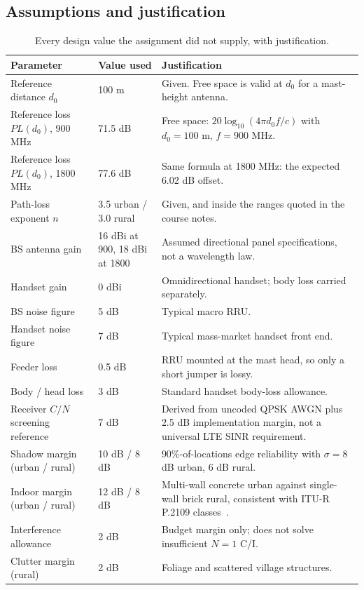 \documentclass[9pt,a4paper]{extarticle}
\begin{document}
\subsection{Assumptions and justification}
\begin{table}[H]\centering\small
\caption{Every design value the assignment did not supply, with justification.}
\label{tab:assume}
\begin{tabularx}{\textwidth}{@{}p{3.5cm}p{1.9cm}X@{}}
\toprule
\textbf{Parameter} & \textbf{Value used} & \textbf{Justification} \\
\midrule
Reference distance $d_0$ & 100 m & Given. Free space is valid at $d_0$ for a mast-height antenna. \\
Reference loss $PL(d_0)$, 900 MHz & 71.5 dB & Free space: $20\log_{10}(4\pi d_0 f/c)$ with $d_0=100$ m, $f=900$ MHz. \\
Reference loss $PL(d_0)$, 1800 MHz & 77.6 dB & Same formula at 1800 MHz: the expected 6.02 dB offset. \\
Path-loss exponent $n$ & 3.5 urban / 3.0 rural & Given, and inside the ranges quoted in the course notes. \\
BS antenna gain & 16 dBi at 900, 18 dBi at 1800 & Assumed directional panel specifications, not a wavelength law. \\
Handset gain & 0 dBi & Omnidirectional handset; body loss carried separately. \\
BS noise figure & 5 dB & Typical macro RRU. \\
Handset noise figure & 7 dB & Typical mass-market handset front end. \\
Feeder loss & 0.5 dB & RRU mounted at the mast head, so only a short jumper is lossy. \\
Body / head loss & 3 dB & Standard handset body-loss allowance. \\
Receiver $C/N$ screening reference & 7 dB & Derived from uncoded QPSK AWGN plus 2.5 dB implementation margin, not a universal LTE SINR requirement. \\
Shadow margin (urban / rural) & 10 dB / 8 dB & 90\%-of-locations edge reliability with $\sigma=8$ dB urban, 6 dB rural. \\
Indoor margin (urban / rural) & 12 dB / 8 dB & Multi-wall concrete urban against single-wall brick rural, consistent with ITU-R P.2109 classes~\cite{p2109}. \\
Interference allowance & 2 dB & Budget margin only; does not solve insufficient $N=1$ C/I. \\
Clutter margin (rural) & 2 dB & Foliage and scattered village structures. \\

\end{tabularx}
\end{table}
\end{document}
